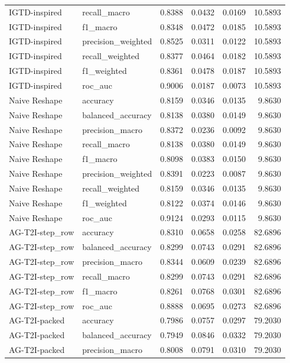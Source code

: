 \begin{tabular}{llrrrr}
IGTD-inspired & recall_macro & 0.8388 & 0.0432 & 0.0169 & 10.5893 \\
IGTD-inspired & f1_macro & 0.8348 & 0.0472 & 0.0185 & 10.5893 \\
IGTD-inspired & precision_weighted & 0.8525 & 0.0311 & 0.0122 & 10.5893 \\
IGTD-inspired & recall_weighted & 0.8377 & 0.0464 & 0.0182 & 10.5893 \\
IGTD-inspired & f1_weighted & 0.8361 & 0.0478 & 0.0187 & 10.5893 \\
IGTD-inspired & roc_auc & 0.9006 & 0.0187 & 0.0073 & 10.5893 \\
Naive Reshape & accuracy & 0.8159 & 0.0346 & 0.0135 & 9.8630 \\
Naive Reshape & balanced_accuracy & 0.8138 & 0.0380 & 0.0149 & 9.8630 \\
Naive Reshape & precision_macro & 0.8372 & 0.0236 & 0.0092 & 9.8630 \\
Naive Reshape & recall_macro & 0.8138 & 0.0380 & 0.0149 & 9.8630 \\
Naive Reshape & f1_macro & 0.8098 & 0.0383 & 0.0150 & 9.8630 \\
Naive Reshape & precision_weighted & 0.8391 & 0.0223 & 0.0087 & 9.8630 \\
Naive Reshape & recall_weighted & 0.8159 & 0.0346 & 0.0135 & 9.8630 \\
Naive Reshape & f1_weighted & 0.8122 & 0.0374 & 0.0146 & 9.8630 \\
Naive Reshape & roc_auc & 0.9124 & 0.0293 & 0.0115 & 9.8630 \\
AG-T2I-step_row & accuracy & 0.8310 & 0.0658 & 0.0258 & 82.6896 \\
AG-T2I-step_row & balanced_accuracy & 0.8299 & 0.0743 & 0.0291 & 82.6896 \\
AG-T2I-step_row & precision_macro & 0.8344 & 0.0609 & 0.0239 & 82.6896 \\
AG-T2I-step_row & recall_macro & 0.8299 & 0.0743 & 0.0291 & 82.6896 \\
AG-T2I-step_row & f1_macro & 0.8261 & 0.0768 & 0.0301 & 82.6896 \\
AG-T2I-step_row & roc_auc & 0.8888 & 0.0695 & 0.0273 & 82.6896 \\
AG-T2I-packed & accuracy & 0.7986 & 0.0757 & 0.0297 & 79.2030 \\
AG-T2I-packed & balanced_accuracy & 0.7949 & 0.0846 & 0.0332 & 79.2030 \\
AG-T2I-packed & precision_macro & 0.8008 & 0.0791 & 0.0310 & 79.2030 \\

\end{tabular}
